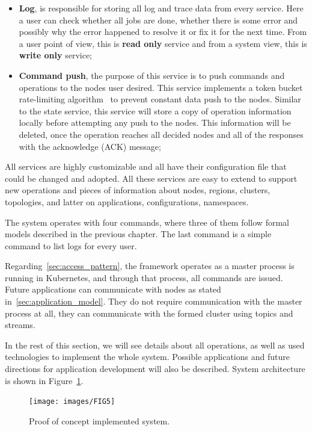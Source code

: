 \begin{itemize}
	\item \textbf{Log}, is responsible for storing all log and trace data from every service. Here a user can check whether all jobs are done, whether there is some error and possibly why the error happened to resolve it or fix it for the next time. From a user point of view, this is \textbf{read only} service and from a system view, this is \textbf{write only} service;
	\item \textbf{Command push}, the purpose of this service is to push commands and operations to the nodes user desired. This service implements a token bucket rate-limiting algorithm~\cite{MathewsKG17} to prevent constant data push to the nodes. Similar to the state service, this service will store a copy of operation information locally before attempting any push to the nodes. This information will be deleted, once the operation reaches all decided nodes and all of the responses with the acknowledge (ACK) message;
\end{itemize}

\noindent
All services are highly customizable and all have their configuration file that could be changed and adopted. All these services are easy to extend to support new operations and pieces of information about nodes, regions, clusters, topologies, and latter on applications, configurations, namespaces.

The system operates with four commands, where three of them follow formal models described in the previous chapter. The last command is a simple command to list logs for every user.

Regarding~\ref{sec:access_pattern}, the framework operates as a master process is running in Kubernetes, and through that process, all commands are issued. Future applications can communicate with nodes as stated in~\ref{sec:application_model}. They do not require communication with the master process at all, they can communicate with the formed cluster using topics and streams.

In the rest of this section, we will see details about all operations, as well as used technologies to implement the whole system. Possible applications and future directions for application development will also be described. System architecture is shown in Figure~\ref{fig:fig11}.

\begin{figure}[H]
	\begin{center}
		\texttt{[image: images/FIG5]}
	\end{center}
	\vspace{-0.5cm}
	\caption{Proof of concept implemented system.}
	\label{fig:fig11}
\end{figure}
%
%
